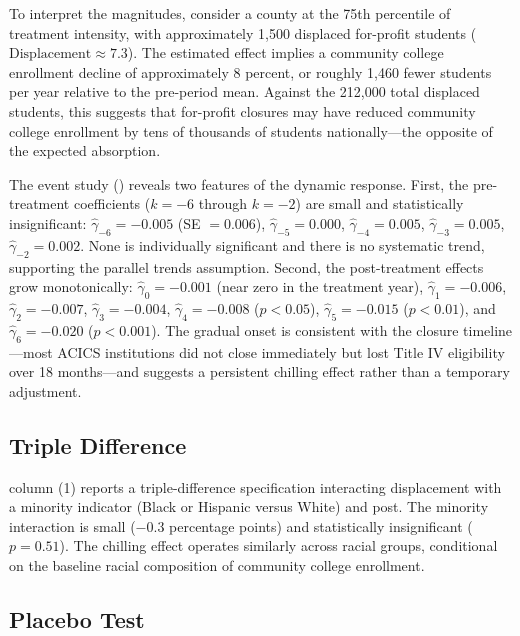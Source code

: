 \documentclass[12pt]{article}
\begin{document}


To interpret the magnitudes, consider a county at the 75th percentile of treatment intensity, with approximately 1,500 displaced for-profit students ($\text{Displacement} \approx 7.3$). The estimated effect implies a community college enrollment decline of approximately 8 percent, or roughly 1,460 fewer students per year relative to the pre-period mean. Against the 212,000 total displaced students, this suggests that for-profit closures may have reduced community college enrollment by tens of thousands of students nationally---the opposite of the expected absorption.

The event study () reveals two features of the dynamic response. First, the pre-treatment coefficients ($k = -6$ through $k = -2$) are small and statistically insignificant: $\hat{\gamma}_{-6} = -0.005$ (SE $= 0.006$), $\hat{\gamma}_{-5} = 0.000$, $\hat{\gamma}_{-4} = 0.005$, $\hat{\gamma}_{-3} = 0.005$, $\hat{\gamma}_{-2} = 0.002$. None is individually significant and there is no systematic trend, supporting the parallel trends assumption. Second, the post-treatment effects grow monotonically: $\hat{\gamma}_0 = -0.001$ (near zero in the treatment year), $\hat{\gamma}_1 = -0.006$, $\hat{\gamma}_2 = -0.007$, $\hat{\gamma}_3 = -0.004$, $\hat{\gamma}_4 = -0.008$ ($p < 0.05$), $\hat{\gamma}_5 = -0.015$ ($p < 0.01$), and $\hat{\gamma}_6 = -0.020$ ($p < 0.001$). The gradual onset is consistent with the closure timeline---most ACICS institutions did not close immediately but lost Title IV eligibility over 18 months---and suggests a persistent chilling effect rather than a temporary adjustment.

\subsection{Triple Difference}

 column (1) reports a triple-difference specification interacting displacement with a minority indicator (Black or Hispanic versus White) and post. The minority interaction is small ($-0.3$ percentage points) and statistically insignificant ($p = 0.51$). The chilling effect operates similarly across racial groups, conditional on the baseline racial composition of community college enrollment.



\subsection{Placebo Test}
\end{document}
